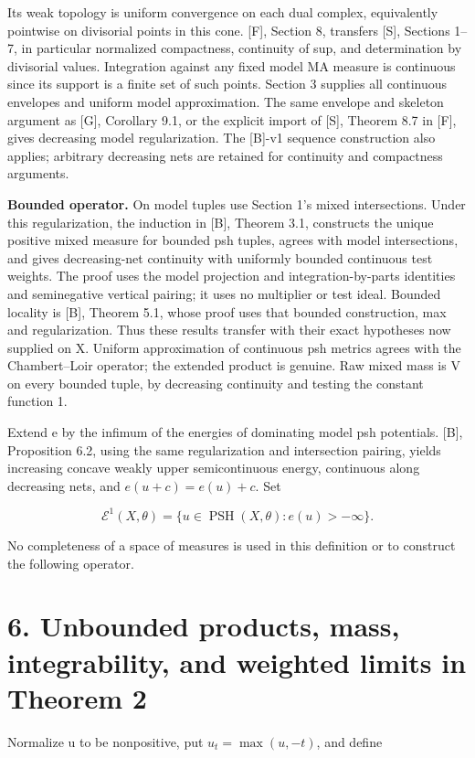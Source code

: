 \documentclass[11pt]{article}
\newcommand{\PSH}{\operatorname{PSH}}
\begin{document}
Its weak topology is uniform convergence on each dual complex, equivalently pointwise on divisorial points in this cone. [F], Section 8, transfers [S], Sections 1--7, in particular normalized compactness, continuity of sup, and determination by divisorial values. Integration against any fixed model MA measure is continuous since its support is a finite set of such points. Section 3 supplies all continuous envelopes and uniform model approximation. The same envelope and skeleton argument as [G], Corollary 9.1, or the explicit import of [S], Theorem 8.7 in [F], gives decreasing model regularization. The [B]-v1 sequence construction also applies; arbitrary decreasing nets are retained for continuity and compactness arguments.

\textbf{Bounded operator.} On model tuples use Section 1's mixed intersections. Under this regularization, the induction in [B], Theorem 3.1, constructs the unique positive mixed measure for bounded psh tuples, agrees with model intersections, and gives decreasing-net continuity with uniformly bounded continuous test weights. The proof uses the model projection and integration-by-parts identities and seminegative vertical pairing; it uses no multiplier or test ideal. Bounded locality is [B], Theorem 5.1, whose proof uses that bounded construction, max and regularization. Thus these results transfer with their exact hypotheses now supplied on X. Uniform approximation of continuous psh metrics agrees with the Chambert--Loir operator; the extended product is genuine. Raw mixed mass is V on every bounded tuple, by decreasing continuity and testing the constant function 1.

Extend e by the infimum of the energies of dominating model psh potentials. [B], Proposition 6.2, using the same regularization and intersection pairing, yields increasing concave weakly upper semicontinuous energy, continuous along decreasing nets, and \(e(u+c)=e(u)+c\). Set

\[
\mathcal E^1(X,\theta)=\{u\in\PSH(X,\theta):e(u)>-\infty\}.
\]

No completeness of a space of measures is used in this definition or to construct the following operator.

\section*{6. Unbounded products, mass, integrability, and weighted limits in Theorem 2}

Normalize u to be nonpositive, put \(u_t=\max(u,-t)\), and define
\end{document}
